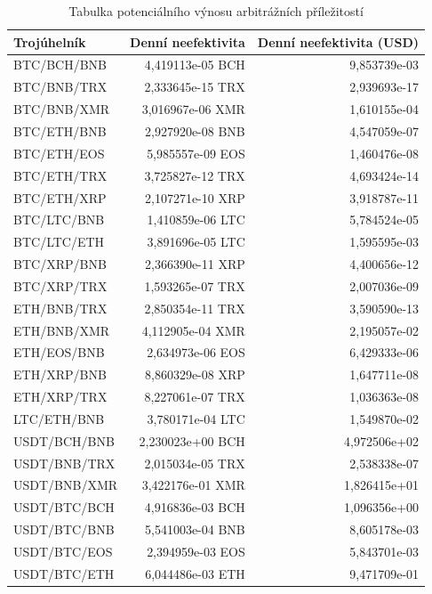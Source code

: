 \documentclass[thesis=B,czech]{FITthesis}[2019/03/21]
\begin{document}
\begin{table}\centering
\caption{Tabulka potenciálního výnosu arbitrážních příležitostí}
\label{table_gains}
\begin{tabular}{|| l | r | r ||}\hline Trojúhelník & Denní neefektivita & Denní neefektivita (USD)\\ [0.5ex]
 \hline\hline BTC/BCH/BNB & 4,419113e-05 BCH & 9,853739e-03\\ 
 \hline BTC/BNB/TRX & 2,333645e-15 TRX & 2,939693e-17\\ 
 \hline BTC/BNB/XMR & 3,016967e-06 XMR & 1,610155e-04\\ 
 \hline BTC/ETH/BNB & 2,927920e-08 BNB & 4,547059e-07\\ 
 \hline BTC/ETH/EOS & 5,985557e-09 EOS & 1,460476e-08\\ 
 \hline BTC/ETH/TRX & 3,725827e-12 TRX & 4,693424e-14\\ 
 \hline BTC/ETH/XRP & 2,107271e-10 XRP & 3,918787e-11\\ 
 \hline BTC/LTC/BNB & 1,410859e-06 LTC & 5,784524e-05\\ 
 \hline BTC/LTC/ETH & 3,891696e-05 LTC & 1,595595e-03\\ 
 \hline BTC/XRP/BNB & 2,366390e-11 XRP & 4,400656e-12\\ 
 \hline BTC/XRP/TRX & 1,593265e-07 TRX & 2,007036e-09\\ 
 \hline ETH/BNB/TRX & 2,850354e-11 TRX & 3,590590e-13\\ 
 \hline ETH/BNB/XMR & 4,112905e-04 XMR & 2,195057e-02\\ 
 \hline ETH/EOS/BNB & 2,634973e-06 EOS & 6,429333e-06\\ 
 \hline ETH/XRP/BNB & 8,860329e-08 XRP & 1,647711e-08\\ 
 \hline ETH/XRP/TRX & 8,227061e-07 TRX & 1,036363e-08\\ 
 \hline LTC/ETH/BNB & 3,780171e-04 LTC & 1,549870e-02\\ 
 \hline USDT/BCH/BNB & 2,230023e+00 BCH & 4,972506e+02\\ 
 \hline USDT/BNB/TRX & 2,015034e-05 TRX & 2,538338e-07\\ 
 \hline USDT/BNB/XMR & 3,422176e-01 XMR & 1,826415e+01\\ 
 \hline USDT/BTC/BCH & 4,916836e-03 BCH & 1,096356e+00\\ 
 \hline USDT/BTC/BNB & 5,541003e-04 BNB & 8,605178e-03\\ 
 \hline USDT/BTC/EOS & 2,394959e-03 EOS & 5,843701e-03\\ 
 \hline USDT/BTC/ETH & 6,044486e-03 ETH & 9,471709e-01\\ 

\end{tabular}
\end{table}
\end{document}
